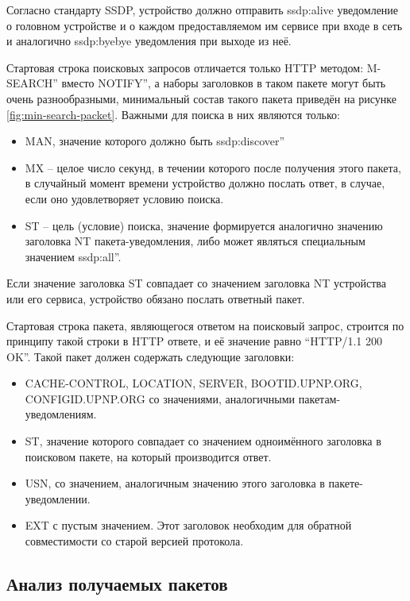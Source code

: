Согласно стандарту SSDP, устройство должно отправить ssdp:alive уведомление о головном устройстве и о каждом предоставляемом им сервисе при входе в сеть и аналогично ssdp:byebye уведомления при выходе из неё.

Стартовая строка поисковых запросов отличается только HTTP методом: M-SEARCH'' вместо NOTIFY'', а наборы заголовков в таком пакете могут быть очень разнообразными, минимальный состав такого пакета приведён на рисунке \ref{fig:min-search-packet}.
Важными для поиска в них являются только:
\begin{itemize}
	\item MAN, значение которого должно быть ssdp:discover'' 	
	\item MX – целое число секунд, в течении которого после получения этого пакета, в случайный момент времени устройство должно послать ответ, в случае, если оно удовлетворяет условию поиска.
	\item ST – цель (условие) поиска, значение формируется аналогично значению заголовка NT пакета-уведомления, либо может являться специальным значением ssdp:all''.
\end{itemize}
Если значение заголовка ST совпадает со значением заголовка NT устройства или его сервиса, устройство обязано послать ответный пакет.


Стартовая строка пакета, являющегося ответом на поисковый запрос, строится по принципу такой строки в HTTP ответе, и её значение равно ``HTTP/1.1 200 OK''.
Такой пакет должен содержать следующие заголовки:
\begin{itemize}
	\item CACHE-CONTROL, LOCATION, SERVER, BOOTID.UPNP.ORG, CONFIGID.UPNP.ORG со значениями, аналогичными пакетам-уведомлениям.
	\item ST, значение которого совпадает со значением одноимённого заголовка в поисковом пакете, на который производится ответ.
	\item USN, со значением, аналогичным значению этого заголовка в пакете-уведомлении.
	\item EXT с пустым значением.
Этот заголовок необходим для обратной совместимости со старой версией протокола.
\end{itemize}

\subsection{Анализ получаемых пакетов}

